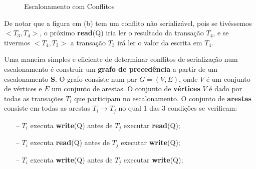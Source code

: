\documentclass[oneside]{book}
\theoremstyle{definition}
\begin{document}
\begin{figure}[H]%
    \centering
    \qquad
    \caption{Escalonamento com Conflitos}%
    \label{fig:example}%
\end{figure}
De notar que a figura em (b) tem um conflito não serializável, pois se tivéssemos $<T_3 , T_4>$, o próximo \textbf{read}(Q) iria ler o resultado da transação $T_4$, e se tivermos $<T_4 , T_3>$ a transação $T_3$ irá ler o valor da escrita em $T_4$.

Uma maneira simples e eficiente de determinar conflitos de serialização num escalonamento é construir um \textbf{grafo de precedência} a partir de um escalonamento \textbf{S}. O grafo consiste num par $G = (V, E)$, onde $V$ é um conjunto de vértices e $E$ um conjunto de arestas. O conjunto de \textbf{vértices} $V$ é dado por todas as transações $T_i$ que participam no escalonamento. O conjunto de \textbf{arestas} consiste em todas as arestas $T_i \rightarrow T_j$ no qual 1 das 3 condições se verificam:
\begin{itemize}
    \itemsep 0cm
    \item[--] $T_i$ executa \textbf{write}(Q) antes de $T_j$ executar \textbf{read}(Q);
    \item[--] $T_i$ executa \textbf{read}(Q) antes de $T_j$ executar \textbf{write}(Q);
    \item[--] $T_i$ executa \textbf{write}(Q) antes de $T_j$ executar \textbf{write}(Q);
\end{itemize}
\end{document}
